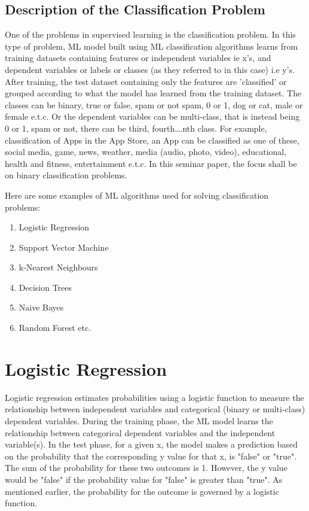 \documentclass[conference]{IEEEtran}
\begin{document}
\subsection{Description of the Classification Problem}
One of the problems in supervised learning is the classification problem. In this type of problem, ML model built using ML classification algorithms learns from training datasets containing features or independent variables ie x's, and dependent variables or labels or classes (as they referred to in this case) i.e y's. After training, the test dataset containing only the features are 'classified' or grouped according to what the model has learned from the training dataset. The classes can be binary, true or false, spam or not spam, 0 or 1, dog or cat, male or female e.t.c. Or the dependent variables can be multi-class, that is instead being 0 or 1, spam or not, there can be third, fourth….nth class. For example, classification of Apps in the App Store, an App can be classified as one of these, social media, game, news, weather, media (audio, photo, video), educational, health and fitness, entertainment e.t.c. In this seminar paper, the focus shall be on binary classification problems.

Here are some examples of ML algorithms used for solving classification problems:
\begin{enumerate}
\item Logistic Regression
\item Support Vector Machine
\item k-Nearest Neighbours
\item Decision Trees
\item Naive Bayes
\item Random Forest etc.
\end{enumerate}

\section{Logistic Regression}
Logistic regression estimates probabilities using a logistic function to measure the relationship between independent variables and categorical (binary or multi-class) dependent variables. During the training phase, the ML model learns the relationship between categorical dependent variables and the independent variable(s). In the test phase, for a given x, the model makes a prediction based on the probability that the corresponding y value for that x, is "false" or "true". The sum of the
probability for these two outcomes is 1. However, the y value would be "false" if the probability value for "false" is greater than "true". As mentioned earlier, the probability for the outcome is governed by a logistic function.
\end{document}
